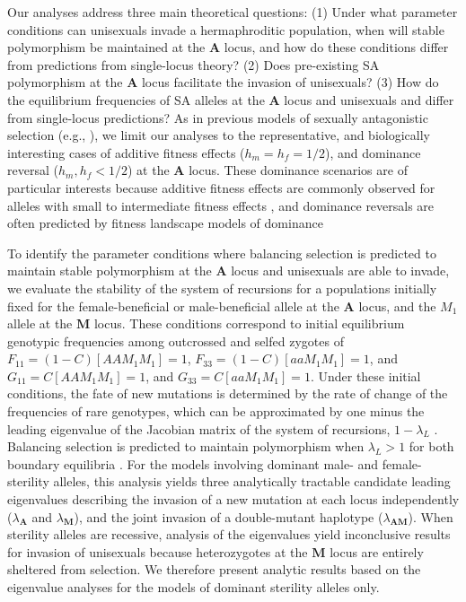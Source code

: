\documentclass[9pt,twocolumn,twoside,lineno]{gsajnl}
\begin{document}
Our analyses address three main theoretical questions: (1) Under what parameter conditions can unisexuals invade a hermaphroditic population, when will stable polymorphism be maintained at the $\mathbf{A}$ locus, and how do these conditions differ from predictions from single-locus theory? (2) Does pre-existing SA polymorphism at the $\mathbf{A}$ locus facilitate the invasion of unisexuals? (3) How do the equilibrium frequencies of SA alleles at the $\mathbf{A}$ locus and unisexuals and differ from single-locus predictions? As in previous models of sexually antagonistic selection (e.g., \citealp{Kidwell1977,Prout2000,JordanConnallon2014}), we limit our analyses to the representative, and biologically interesting cases of additive fitness effects ($h_m = h_f = 1/2$), and dominance reversal ($h_m, h_f < 1/2$) at the $\mathbf{A}$ locus. These dominance scenarios are of particular interests because additive fitness effects are commonly observed for alleles with small to intermediate fitness effects \citep{Agrawal2011}, and dominance reversals are often predicted by fitness landscape models of dominance \citep{Manna2011, ConnallonClark2014}

To identify the parameter conditions where balancing selection is predicted to maintain stable polymorphism at the $\mathbf{A}$ locus and unisexuals are able to invade, we evaluate the stability of the system of recursions for a populations initially fixed for the female-beneficial  or male-beneficial allele at the $\mathbf{A}$ locus, and the $M_1$ allele at the $\mathbf{M}$ locus. These conditions correspond to initial equilibrium genotypic frequencies among outcrossed and selfed zygotes of $F_{11} = (1 - C) [AAM_1M_1] = 1$, $F_{33} = (1 - C) [aaM_1M_1] = 1$, and $G_{11} = C [AAM_1M_1] = 1$, and $G_{33} = C [aaM_1M_1] = 1$. Under these initial conditions, the fate of new mutations is determined by the rate of change of the frequencies of rare genotypes, which can be approximated by one minus the leading eigenvalue of the Jacobian matrix of the system of recursions, $1 - \lambda_L$ \citep{OttoDay2007}. Balancing selection is predicted to maintain polymorphism when $\lambda_L > 1$ for both boundary equilibria \citep{Prout1968,OttoDay2007}. For the models involving dominant male- and female-sterility alleles, this analysis yields three analytically tractable candidate leading eigenvalues describing the invasion of a new mutation at each locus independently ($\lambda_\mathbf{A}$ and $\lambda_\mathbf{M}$), and the joint invasion of a double-mutant haplotype ($\lambda_\mathbf{AM}$). When sterility alleles are recessive, analysis of the eigenvalues yield inconclusive results for invasion of unisexuals because heterozygotes at the $\mathbf{M}$ locus are entirely sheltered from selection. We therefore present analytic results based on the eigenvalue analyses for the models of dominant sterility alleles only.
\end{document}
